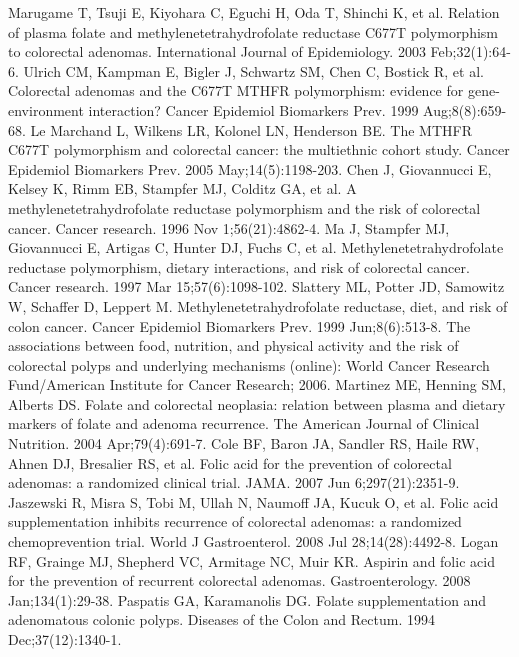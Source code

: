 \begin{thebibliography}{12}
		Marugame T, Tsuji E, Kiyohara C, Eguchi H, Oda T, Shinchi K, et al. Relation of plasma folate and methylenetetrahydrofolate reductase C677T polymorphism to colorectal adenomas. International Journal of Epidemiology. 2003 Feb;32(1):64-6. 
		Ulrich CM, Kampman E, Bigler J, Schwartz SM, Chen C, Bostick R, et al. Colorectal adenomas and the C677T MTHFR polymorphism: evidence for gene-environment interaction? Cancer Epidemiol Biomarkers Prev. 1999 Aug;8(8):659-68. 
		Le Marchand L, Wilkens LR, Kolonel LN, Henderson BE. The MTHFR C677T polymorphism and colorectal cancer: the multiethnic cohort study. Cancer Epidemiol Biomarkers Prev. 2005 May;14(5):1198-203. 
		Chen J, Giovannucci E, Kelsey K, Rimm EB, Stampfer MJ, Colditz GA, et al. A methylenetetrahydrofolate reductase polymorphism and the risk of colorectal cancer. Cancer research. 1996 Nov 1;56(21):4862-4. 
		Ma J, Stampfer MJ, Giovannucci E, Artigas C, Hunter DJ, Fuchs C, et al. Methylenetetrahydrofolate reductase polymorphism, dietary interactions, and risk of colorectal cancer. Cancer research. 1997 Mar 15;57(6):1098-102. 
		Slattery ML, Potter JD, Samowitz W, Schaffer D, Leppert M. Methylenetetrahydrofolate reductase, diet, and risk of colon cancer. Cancer Epidemiol Biomarkers Prev. 1999 Jun;8(6):513-8. 
		The associations between food, nutrition, and physical activity and the risk of colorectal polyps and underlying mechanisms (online): World Cancer Research Fund/American Institute for Cancer Research; 2006. 
		Martinez ME, Henning SM, Alberts DS. Folate and colorectal neoplasia: relation between plasma and dietary markers of folate and adenoma recurrence. The American Journal of Clinical Nutrition. 2004 Apr;79(4):691-7. 
		Cole BF, Baron JA, Sandler RS, Haile RW, Ahnen DJ, Bresalier RS, et al. Folic acid for the prevention of colorectal adenomas: a randomized clinical trial. JAMA. 2007 Jun 6;297(21):2351-9. 
		Jaszewski R, Misra S, Tobi M, Ullah N, Naumoff JA, Kucuk O, et al. Folic acid supplementation inhibits recurrence of colorectal adenomas: a randomized chemoprevention trial. World J Gastroenterol. 2008 Jul 28;14(28):4492-8. 
		Logan RF, Grainge MJ, Shepherd VC, Armitage NC, Muir KR. Aspirin and folic acid for the prevention of recurrent colorectal adenomas. Gastroenterology. 2008 Jan;134(1):29-38. 
		Paspatis GA, Karamanolis DG. Folate supplementation and adenomatous colonic polyps. Diseases of the Colon and Rectum. 1994 Dec;37(12):1340-1. 

\end{thebibliography}
